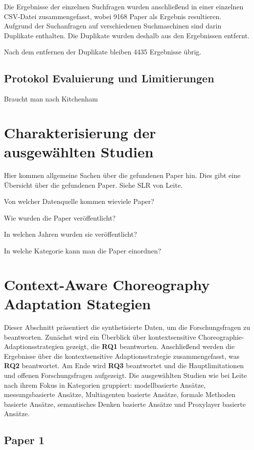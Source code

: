 \documentclass[conference,compsoc]{IEEEtran}
\begin{document}
Die Ergebnisse der einzelnen Suchfragen wurden anschließend in einer einzelnen CSV-Datei zusammengefasst, wobei 9168 Paper als Ergebnis resultieren. Aufgrund der Suchanfragen auf verschiedenen Suchmaschinen sind darin Duplikate enthalten. Die Duplikate wurden deshalb aus den Ergebnissen entfernt.


Nach dem entfernen der Duplikate bleiben 4435 Ergebnisse übrig.

\subsection{Protokol Evaluierung und Limitierungen}
Braucht man nach Kitchenham

\section{Charakterisierung der ausgewählten Studien}
Hier kommen allgemeine Sachen über die gefundenen Paper hin. Dies gibt eine Übersicht über die gefundenen Paper. Siehe SLR von Leite\cite{leite2013systematic}.

Von welcher Datenquelle kommen wieviele Paper?

Wie wurden die Paper veröffentlicht?

In welchen Jahren wurden sie veröffentlicht?

In welche Kategorie kann man die Paper einordnen?

\section{Context-Aware Choreography Adaptation Stategien}
Dieser Abschnitt präsentiert die synthetisierte Daten, um die Forschungsfragen zu beantworten. Zunächst wird ein Überblick über  kontextsensitive Choreographie-Adaptionsstrategien gezeigt, die \textbf{RQ1} beantworten. Anschließend werden die Ergebnisse über die kontextsensitive Adaptionsstrategie zusammengefasst, was \textbf{RQ2} beantwortet. Am Ende wird \textbf{RQ3} beantwortet und die Hauptlimitationen und offenen Forschungsfragen aufgezeigt.
Die ausgewählten Studien wie bei Leite~\cite{leite2013systematic} nach ihrem Fokus in Kategorien gruppiert: modellbasierte Ansätze, messungsbasierte Ansätze, Multiagenten basierte Ansätze, formale Methoden basierte Ansätze, semantisches Denken basierte Ansätze und Proxylayer basierte Ansätze.

\subsection{Paper 1}
\end{document}
